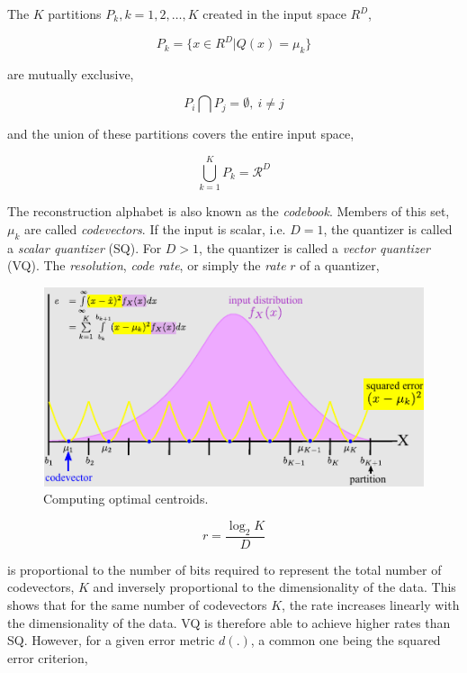 The $K$ partitions $P_k, k = 1, 2, \ldots, K$ created in the input space $R^D$, 

\begin{equation}
P_k = \{x \in R^D | Q(x) = \mu_k\}
\end{equation}   

are mutually exclusive,

\begin{equation}
P_i \bigcap P_j = \emptyset, \ i \neq j
\end{equation}

and the union of these partitions covers the entire input space,

\begin{equation}
\bigcup\limits_{k=1}^{K} P_k=\mathcal{R}^D
\end{equation}

The reconstruction alphabet is also known as the \emph{codebook}.  Members of this set, $\mu_k$ are called \emph{codevectors}.  If the input is scalar, i.e. $D=1$, the quantizer is called a \emph{scalar quantizer} (SQ).  For $D>1$, the quantizer is called a \emph{vector quantizer} (VQ).  The \emph{resolution}, \emph{code rate}, or simply the \emph{rate} $r$ of a quantizer, 


\begin{figure}[t]			
	\includegraphics[width=1\textwidth]{thesis/Quantization_MSE.pdf}
	\caption{Computing optimal centroids.}
	\label{fig:computing_optimal_centroids}	
\end{figure}

\begin{equation}
r=\frac{\log_2 K}{D}
\end{equation}  

is proportional to the number of bits required to represent the total number of codevectors, $K$ and inversely proportional to the dimensionality of the data.  This shows that for the same number of codevectors $K$, the rate increases linearly with the dimensionality of the data.  VQ is therefore able to achieve higher rates than SQ.  However, for a given error metric $d(.)$, a common one being the squared error criterion, 

